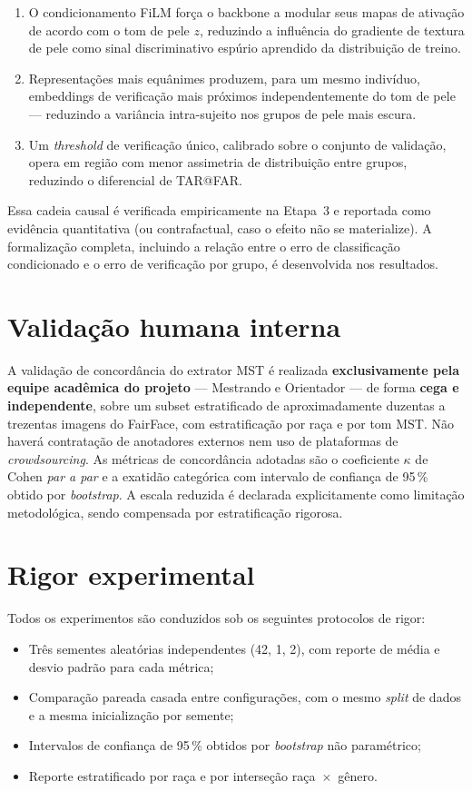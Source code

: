 \begin{enumerate}
\item O condicionamento FiLM força o backbone a modular seus mapas de ativação de acordo com o tom de pele $z$, reduzindo a influência do gradiente de textura de pele como sinal discriminativo espúrio aprendido da distribuição de treino.
\item Representações mais equânimes produzem, para um mesmo indivíduo, embeddings de verificação mais próximos independentemente do tom de pele --- reduzindo a variância intra-sujeito nos grupos de pele mais escura.
\item Um \emph{threshold} de verificação único, calibrado sobre o conjunto de validação, opera em região com menor assimetria de distribuição entre grupos, reduzindo o diferencial de TAR@FAR.
\end{enumerate}

Essa cadeia causal é verificada empiricamente na Etapa~3 e reportada como evidência quantitativa (ou contrafactual, caso o efeito não se materialize). A formalização completa, incluindo a relação entre o erro de classificação condicionado e o erro de verificação por grupo, é desenvolvida nos resultados.

\section{Validação humana interna}
\label{sec:validacao_interna}

A validação de concordância do extrator MST é realizada \textbf{exclusivamente pela equipe acadêmica do projeto} --- Mestrando e Orientador --- de forma \textbf{cega e independente}, sobre um subset estratificado de aproximadamente duzentas a trezentas imagens do FairFace, com estratificação por raça e por tom MST. Não haverá contratação de anotadores externos nem uso de plataformas de \emph{crowdsourcing}. As métricas de concordância adotadas são o coeficiente $\kappa$ de Cohen \emph{par a par} e a exatidão categórica com intervalo de confiança de 95\,\% obtido por \emph{bootstrap}. A escala reduzida é declarada explicitamente como limitação metodológica, sendo compensada por estratificação rigorosa.

\section{Rigor experimental}
\label{sec:rigor}

Todos os experimentos são conduzidos sob os seguintes protocolos de rigor:

\begin{itemize}
\item Três sementes aleatórias independentes (42, 1, 2), com reporte de média e desvio padrão para cada métrica;
\item Comparação pareada casada entre configurações, com o mesmo \emph{split} de dados e a mesma inicialização por semente;
\item Intervalos de confiança de 95\,\% obtidos por \emph{bootstrap} não paramétrico;
\item Reporte estratificado por raça e por interseção raça~$\times$~gênero.
\end{itemize}